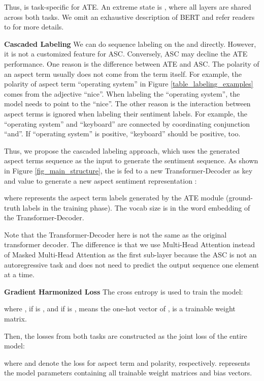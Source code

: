 \documentclass[11pt,a4paper]{article}
\begin{document}
Thus,  is task-specific for ATE. An extreme state is , where all layers are shared across both tasks. We omit an exhaustive description of BERT and refer readers to \citet{Devlin2019} for more details.

\noindent
\textbf{Cascaded Labeling}\quad
We can do sequence labeling on the  and  directly. However, it is not a customized feature for ASC. Conversely, ASC may decline the ATE performance. One reason is the difference between ATE and ASC. The polarity of an aspect term usually does not come from the term itself. For example, the polarity of aspect term ``operating system'' in Figure \ref{table_labeling_examples} comes from the adjective ``nice''. When labeling the ``operating system'', the model needs to point to the ``nice''. The other reason is the interaction between aspect terms is ignored when labeling their sentiment labels. For example, the ``operating system'' and ``keyboard'' are connected by coordinating conjunction ``and''. If ``operating system'' is positive, ``keyboard'' should be positive, too.

Thus, we propose the cascaded labeling approach, which uses the generated aspect terms sequence as the input to generate the sentiment sequence. As shown in Figure \ref{fig_main_structure}, the  is fed to a new Transformer-Decoder \cite{Vaswani2017} as key  and value  to generate a new aspect sentiment representation :
 
where  represents the aspect term labels generated by the ATE module (ground-truth labels in the training phase). The vocab size is  in the word embedding of the Transformer-Decoder. 

Note that the Transformer-Decoder here is not the same as the original transformer decoder. The difference is that we use Multi-Head Attention instead of Masked Multi-Head Attention as the first sub-layer because the ASC is not an autoregressive task and does not need to predict the output sequence one element at a time.

\noindent
\textbf{Gradient Harmonized Loss}\quad
The cross entropy is used to train the model:

where ,  if  is , and  if  is ,  means the one-hot vector of ,  is a trainable weight matrix. 

Then, the losses from both tasks are constructed as the joint loss of the entire model:

where  and  denote the loss for aspect term and polarity, respectively.  represents the model parameters containing all trainable weight matrices and bias vectors. 
\end{document}
